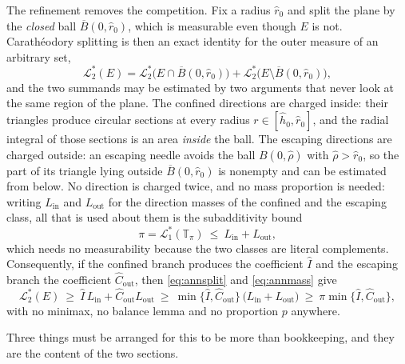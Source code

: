 \documentclass[11pt]{article}
\theoremstyle{plain}
\theoremstyle{definition}
\theoremstyle{remark}
\newcommand{\Tp}{\mathbb{T}_{\pi}}
\newcommand{\Lout}{\mathcal{L}^{*}_{2}}
\newcommand{\Lone}{\mathcal{L}^{*}_{1}}
\begin{document}
The refinement removes the competition. Fix a radius $\hat r_{0}$ and split the
plane by the \emph{closed} ball $\overline B(0,\hat r_{0})$, which is
measurable even though $E$ is not. Carath\'eodory splitting is then an exact
identity for the outer measure of an arbitrary set,
\begin{equation}\label{eq:annsplit}
  \Lout(E)
  =\Lout\bigl(E\cap\overline B(0,\hat r_{0})\bigr)
  +\Lout\bigl(E\setminus\overline B(0,\hat r_{0})\bigr),
\end{equation}
and the two summands may be estimated by two arguments that never look at the
same region of the plane. The confined directions are charged inside: their
triangles produce circular sections at every radius $r\in[\hat h_{0},\hat
r_{0}]$, and the radial integral of those sections is an area \emph{inside} the
ball. The escaping directions are charged outside: an escaping needle avoids
the ball $B(0,\hat\rho)$ with $\hat\rho>\hat r_{0}$, so the part of its
triangle lying outside $\overline B(0,\hat r_{0})$ is nonempty and can be
estimated from below. No direction is charged twice, and no mass proportion is
needed: writing $L_{\mathrm{in}}$ and $L_{\mathrm{out}}$ for the direction
masses of the confined and the escaping class, all that is used about them is
the subadditivity bound
\begin{equation}\label{eq:annmass}
  \pi=\Lone(\Tp)\ \le\ L_{\mathrm{in}}+L_{\mathrm{out}} ,
\end{equation}
which needs no measurability because the two classes are literal complements.
Consequently, if the confined branch produces the coefficient $\hat I$ and the
escaping branch the coefficient $\hat C_{\mathrm{out}}$, then
\eqref{eq:annsplit} and \eqref{eq:annmass} give
\[
  \Lout(E)\ \ge\ \hat I\,L_{\mathrm{in}}+\hat C_{\mathrm{out}}L_{\mathrm{out}}
  \ \ge\ \min\{\hat I,\hat C_{\mathrm{out}}\}\,\bigl(L_{\mathrm{in}}+L_{\mathrm{out}}\bigr)
  \ \ge\ \pi\min\{\hat I,\hat C_{\mathrm{out}}\},
\]
with no minimax, no balance lemma and no proportion $p$ anywhere.

Three things must be arranged for this to be more than bookkeeping, and they
are the content of the two sections.
\end{document}
